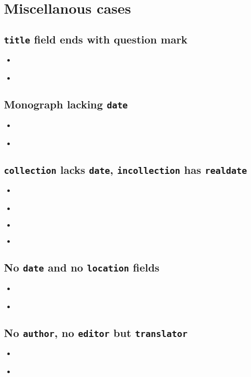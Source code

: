 \documentclass[a4paper,12pt]{scrartcl}
\newcommand*{\Typ}[1]{\texttt{\symbol{64}#1}}
\newcommand*{\Feld}[1]{\texttt{#1}}
\begin{document}
\section{Miscellanous cases}

\subsection{\Feld{title} field ends with question mark}
\begin{itemize}
    \item\cite{edenmo:1997}%
    \item{}
\end{itemize}

\subsection{Monograph lacking \Feld{date}}
\begin{itemize}
    \item\cite{siebert:u:et:al:o:j}%
    \item{}%
\end{itemize}

\subsection{\Typ{collection} lacks \Feld{date}, \Typ{incollection} has \Feld{realdate}}
\begin{itemize}
    \item\cite{huet:o:j}%
    \item{}%
    \item\cite{mette:1990}%
    \item{}%
\end{itemize}

\subsection{No \Feld{date} and no \Feld{location} fields}
\begin{itemize}
    \item\cite{fuchs:o:j}%
    \item{}%
\end{itemize}

\subsection{No \Feld{author}, no \Feld{editor} but \Feld{translator}}
\begin{itemize}
    \item\cite{sterk:1777}%
    \item{}%
\end{itemize}
\end{document}
